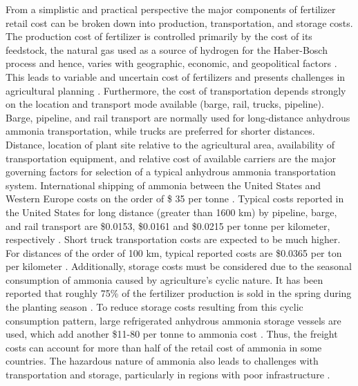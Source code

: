 From a simplistic and practical perspective the major components of fertilizer retail cost can be broken down into production, transportation, and storage costs. The production cost of fertilizer is controlled primarily by the cost of its feedstock, the natural gas used as a source of hydrogen for the Haber-Bosch process and hence, varies with geographic, economic, and geopolitical factors \cite{Huang2007,Etienne2016}. 
This leads to variable and uncertain cost of fertilizers and presents challenges in agricultural planning \cite{Etienne2016}. Furthermore, the cost of transportation depends strongly on the location and transport mode available (barge, rail, trucks, pipeline). Barge, pipeline, and rail transport are normally used for long-distance anhydrous ammonia transportation, while trucks are preferred for shorter distances. Distance, location of plant site relative to the agricultural area, availability of transportation equipment, and relative cost of available carriers are the major governing factors for selection of a typical anhydrous ammonia transportation system. International shipping of ammonia between the United States and Western Europe costs on the order of \$ 35 per tonne \cite{ammonia_encyclopedia}. Typical costs reported in the United States for long distance (greater than 1600 km) by pipeline, barge, and rail transport are \$0.0153, \$0.0161 and \$0.0215 per tonne per kilometer, respectively \cite{ammonia_encyclopedia}.  Short truck transportation costs are expected to be much higher. For distances of the order of 100 km, typical reported costs are \$0.0365 per ton per kilometer \cite{ammonia_encyclopedia}. Additionally, storage costs must be considered due to the seasonal consumption of ammonia caused by agriculture's cyclic nature. It has been reported that roughly 75\% of the fertilizer production is sold in the spring during the planting season \cite{ammonia_encyclopedia}. To reduce storage costs resulting from this cyclic consumption pattern, large refrigerated anhydrous ammonia storage vessels are used, which add another \$11-80 per tonne to ammonia cost \cite{IFDC_1998,ammonia_encyclopedia}. Thus, the freight costs can account for more than half of the retail cost of ammonia in some countries.
The hazardous nature of ammonia also leads to challenges with transportation and storage, particularly in regions with poor infrastructure \cite{Etienne2016}. 


